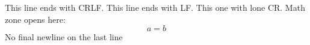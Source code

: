 This line ends with CRLF.
This line ends with LF.
This one with lone CR.
Math zone opens here: \[
  a = b
\]
No final newline on the last line
